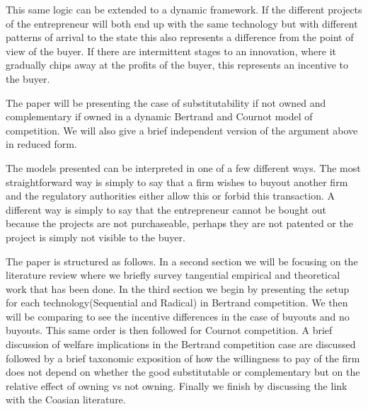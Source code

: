 \documentclass[11pt]{article}
\begin{document}
This same logic can be extended to a dynamic framework. If the different projects of the entrepreneur will both end up with the same technology but with different patterns of arrival to the state this also represents a difference from the point of view of the buyer. If there are intermittent stages to an innovation, where it gradually chips away at the profits of the buyer, this represents an incentive to the buyer. 


The paper will be presenting the case of substitutability if not owned and complementary if owned in a dynamic Bertrand and Cournot model of competition. We will also give a brief independent version of the argument above in reduced form. 

The models presented can be interpreted in one of a few different ways. The most straightforward way is simply to say that a firm wishes to buyout another firm and the regulatory authorities either allow this or forbid this transaction. A different way is simply to say that the entrepreneur cannot be bought out because the projects are not purchaseable, perhaps they are not patented or the project is simply not visible to the buyer. 







The paper is structured as follows. In a second section we will be focusing on the literature review where we briefly survey tangential empirical and theoretical work that has been done. In the third section we begin by presenting the setup for each technology(Sequential and Radical) in Bertrand competition. We then will be comparing to see the incentive differences in the case of buyouts and no buyouts. This same order is then followed for Cournot competition. A brief discussion of welfare implications in the Bertrand competition case are discussed followed by a brief taxonomic exposition of how the willingness to pay of the firm does not depend on whether the good substitutable or complementary but on the relative effect of owning vs not owning. Finally we finish by discussing the link with the Coasian literature.  
\end{document}
